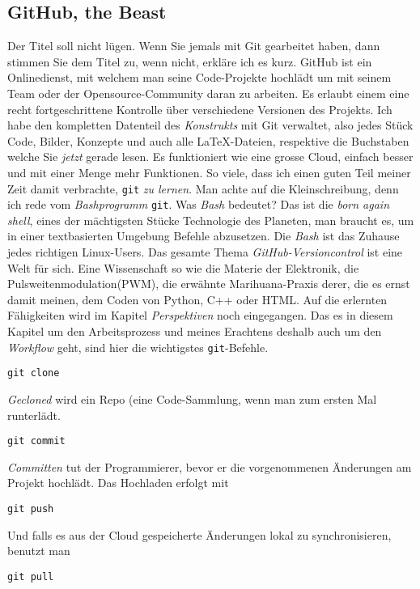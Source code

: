\documentclass[12pt,titlepage,a4paper]{article}
\begin{document}
\subsection{GitHub, the Beast}
Der Titel soll nicht lügen. Wenn Sie jemals mit Git gearbeitet haben, dann stimmen Sie dem Titel zu, wenn nicht, erkläre ich es kurz. GitHub ist ein Onlinedienst, mit welchem man seine Code-Projekte hochlädt um mit seinem Team oder der Opensource-Community daran zu arbeiten. Es erlaubt einem eine recht fortgeschrittene Kontrolle über verschiedene Versionen des Projekts. Ich habe den kompletten Datenteil des \textit{Konstrukts} mit Git verwaltet, also jedes Stück Code, Bilder, Konzepte und auch alle LaTeX-Dateien, respektive die Buchstaben welche Sie \textit{jetzt} gerade lesen. Es funktioniert wie eine grosse Cloud, einfach besser und mit einer Menge mehr Funktionen. So viele, dass ich einen guten Teil meiner Zeit damit verbrachte, \verb^git^ \textit{zu lernen}. Man achte auf die Kleinschreibung, denn ich rede vom \textit{Bashprogramm} \verb?git?. Was \textit{Bash} bedeutet? Das ist die \textit{born again shell}, eines der mächtigsten Stücke Technologie des Planeten, man braucht es, um in einer textbasierten Umgebung Befehle abzusetzen. Die \textit{Bash} ist das Zuhause jedes richtigen Linux-Users. Das gesamte Thema \textit{GitHub-Versioncontrol} ist eine Welt für sich. Eine Wissenschaft so wie die Materie der Elektronik, die Pulsweitenmodulation(PWM), die erwähnte Marihuana-Praxis derer, die es ernst damit meinen, dem Coden von Python, C++ oder HTML. Auf die erlernten Fähigkeiten wird im Kapitel \textit{Perspektiven} noch eingegangen. Das es in diesem Kapitel um den Arbeitsprozess und meines Erachtens deshalb auch um den \textit{Workflow} geht, sind hier die wichtigstes \verb?git?-Befehle.
\begin{verbatim}
git clone
\end{verbatim}
\textit{Gecloned} wird ein Repo (eine Code-Sammlung, wenn man zum ersten Mal runterlädt.
\begin{verbatim}
git commit 
\end{verbatim}
\textit{Committen} tut der Programmierer, bevor er die vorgenommenen Änderungen am Projekt hochlädt. Das Hochladen erfolgt mit
\begin{verbatim}
git push
\end{verbatim}
Und falls es aus der Cloud gespeicherte Änderungen lokal zu synchronisieren, benutzt man
\begin{verbatim}
git pull
\end{verbatim}
\end{document}
